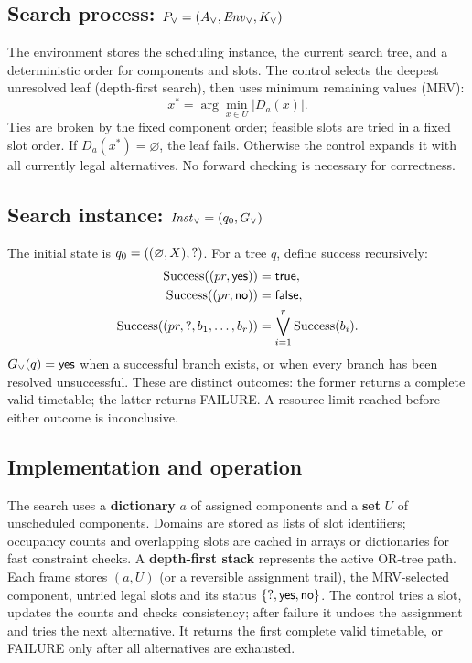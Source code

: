 \subsection{Search process: $P_{\lor}=(A_{\lor},\mathit{Env}_{\lor},K_{\lor})$}
The environment stores the scheduling instance, the current search tree, and a deterministic order for components and slots. The control selects the deepest unresolved leaf (depth-first search), then uses minimum remaining values (MRV):
\[
\boxed{x^*=\arg\min_{x\in U}|D_a(x)|.}
\]
Ties are broken by the fixed component order; feasible slots are tried in a fixed slot order. If $D_a(x^*)=\varnothing$, the leaf fails. Otherwise the control expands it with all currently legal alternatives. No forward checking is necessary for correctness.

\subsection{Search instance: $\mathit{Inst}_{\lor}=(q_0,G_{\lor})$}
The initial state is $q_0=((\varnothing,X),\mathord{?})$. For a tree $q$, define success recursively:
\[
\begin{aligned}
\operatorname{Success}((pr,\mathsf{yes}))&=\mathsf{true},\\
\operatorname{Success}((pr,\mathsf{no}))&=\mathsf{false},\\
\operatorname{Success}((pr,\mathord{?},b_1,\ldots,b_r))&=\bigvee_{i=1}^{r}\operatorname{Success}(b_i).
\end{aligned}
\]
$G_{\lor}(q)=\mathsf{yes}$ when a successful branch exists, or when every branch has been resolved unsuccessful. These are distinct outcomes: the former returns a complete valid timetable; the latter returns FAILURE. A resource limit reached before either outcome is inconclusive.

\subsection{Implementation and operation}
The search uses a \textbf{dictionary} $a$ of assigned components and a \textbf{set} $U$ of unscheduled components. Domains are stored as lists of slot identifiers; occupancy counts and overlapping slots are cached in arrays or dictionaries for fast constraint checks. A \textbf{depth-first stack} represents the active OR-tree path. Each frame stores $(a,U)$ (or a reversible assignment trail), the MRV-selected component, untried legal slots and its status $\{\mathord{?},\mathsf{yes},\mathsf{no}\}$. The control tries a slot, updates the counts and checks consistency; after failure it undoes the assignment and tries the next alternative. It returns the first complete valid timetable, or FAILURE only after all alternatives are exhausted.

